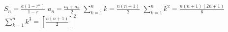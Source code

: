 ${\displaystyle S_{n}={\frac {a(1-r^{n})}{1-r}}}$
${\displaystyle a_{n}={\frac {a_{1}+a_{n}}{2}}}$
${\displaystyle \sum _{k=1}^{n}k={\frac {n(n+1)}{2}}}$
${\displaystyle \sum _{k=1}^{n}k^{2}={\frac {n(n+1)(2n+1)}{6}}}$
${\displaystyle \sum _{k=1}^{n}k^{3}=\left[{\frac {n(n+1)}{2}}\right]^{2}}$


